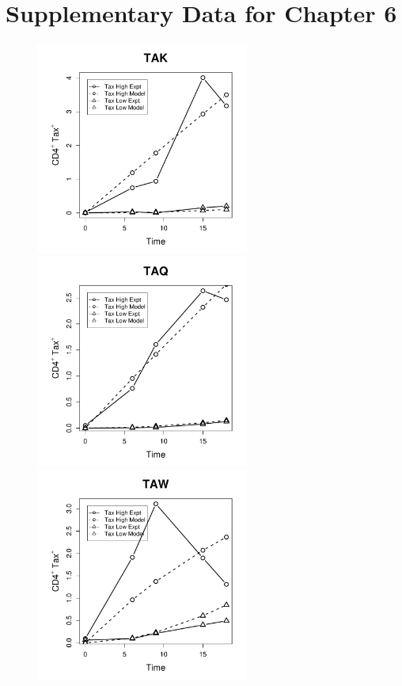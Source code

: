 
\chapter{Supplementary Data for Chapter 6}\label{AppendixB}

\begin{figure}[htp]
\centering
\includegraphics[width=7cm]{./Figures/chapter5/figure_timecourse_tak}%
\hspace{0cm}%
\includegraphics[width=7cm]{./Figures/chapter5/figure_timecourse_taq} \\
\includegraphics[width=7cm]{./Figures/chapter5/figure_timecourse_taw}%

\end{figure}
